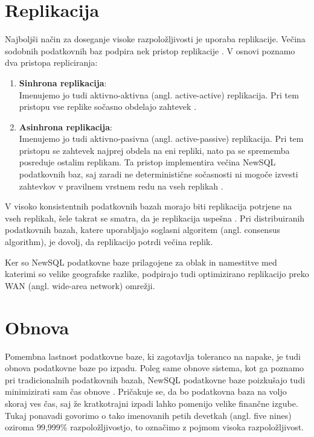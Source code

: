 \documentclass[a4paper, 12pt]{book}
\begin{document}
\section{Replikacija}

Najboljši način za doseganje visoke razpoložljivosti je uporaba replikacije. Večina sodobnih podatkovnih baz podpira nek pristop replikacije \cite{Pavlo2016Sep}. V osnovi poznamo dva pristopa repliciranja:
\begin{enumerate}
    \item \textbf{Sinhrona replikacija}:\\Imenujemo jo tudi aktivno-aktivna (angl. active-active) replikacija. Pri tem pristopu vse replike sočasno obdelajo zahtevek \cite{Pavlo2016Sep}.

    \item \textbf{Asinhrona replikacija}:\\Imenujemo jo tudi aktivno-pasivna (angl. active-passive) replikacija. Pri tem pristopu se zahtevek najprej obdela na eni repliki, nato pa se sprememba posreduje ostalim replikam. Ta pristop implementira večina NewSQL podatkovnih baz, saj zaradi ne deterministične sočas\-nosti ni mogoče izvesti zahtevkov v pravilnem vrstnem redu na vseh replikah \cite{Pavlo2016Sep, harding2017evaluation}.
\end{enumerate}

V visoko konsistentnih podatkovnih bazah morajo biti replikacija potrjene na vseh replikah, šele takrat se smatra, da je replikacija uspešna \cite{NewSqlInMemoryAnalytics}. Pri distribuiranih podatkovnih bazah, katere uporabljajo soglasni algoritem (angl. consensus algorithm), je dovolj, da replikacijo potrdi večina replik.

Ker so NewSQL podatkovne baze prilagojene za oblak in namestitve med katerimi so velike geografske razlike, podpirajo tudi optimizirano replikacijo preko WAN (angl. wide-area network) omrežji.

\section{Obnova}
Pomembna lastnost podatkovne baze, ki zagotavlja toleranco na napake, je tudi obnova podatkovne baze po izpadu. Poleg same obnove sistema, kot ga poznamo pri tradicionalnih podatkovnih bazah, NewSQL podatkovne baze  poizkušajo tudi minimizirati sam čas obnove \cite{Pavlo2016Sep}. Pričakuje se, da bo podatkovna baza na voljo skoraj ves čas, saj že kratkotrajni izpadi lahko pomenijo velike finančne izgube. Tukaj ponavadi govorimo o tako imenovanih petih devetkah (angl. five nines) oziroma 99,999\% razpoložljivostjo, to označimo z pojmom visoka razpoložljivost.
\end{document}
